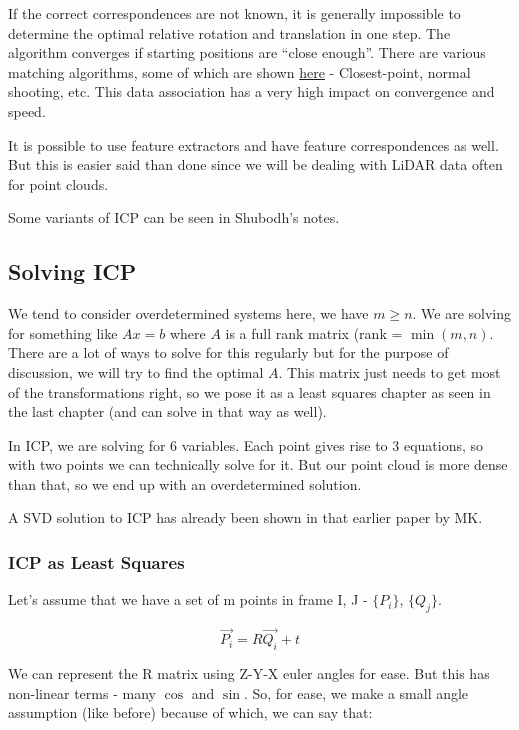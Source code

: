 If the correct correspondences are not known, it is generally impossible to determine the optimal relative rotation and translation in one step. The algorithm converges if starting positions are “close enough”. There are various matching algorithms, some of which are shown \href{https://www.notion.so/Point-Cloud-Registration-Iterative-Closest-Point-a25686ce1a11409d838d47bcac43ab4b#acdbf05aa6834446bc0812b2ae3f0f40}{here} - Closest-point, normal shooting, etc. This data association has a very high impact on convergence and speed.

It is possible to use feature extractors and have feature correspondences as well. But this is easier said than done since we will be dealing with LiDAR data often for point clouds.

Some variants of ICP can be seen in Shubodh's notes. 

\subsection{Solving ICP}

We tend to consider overdetermined systems here, we have $m\geq n$. We are solving for something like $Ax=b$ where $A$ is a full rank matrix (rank = $\min (m, n)$. There are a lot of ways to solve for this regularly but for the purpose of discussion, we will try to find the optimal $A$. This matrix just needs to get most of the transformations right, so we pose it as a least squares chapter as seen in the last chapter (and can solve in that way as well).

In ICP, we are solving for 6 variables. Each point gives rise to 3 equations, so with two points we can technically solve for it. But our point cloud is more dense than that, so we end up with an overdetermined solution. 

A SVD solution to ICP has already been shown in that earlier paper by MK.

\subsubsection{ICP as Least Squares}

Let's assume that we have a set of m points in frame I, J - $\{P_i\}$, $\{Q_j\}$.

\begin{equation}
    \Vec{P_i} = R\Vec{Q_i} + t
\end{equation}

We can represent the R matrix using Z-Y-X euler angles for ease. But this has non-linear terms - many $\cos$ and $\sin$. So, for ease, we make a small angle assumption (like before) because of which, we can say that:

